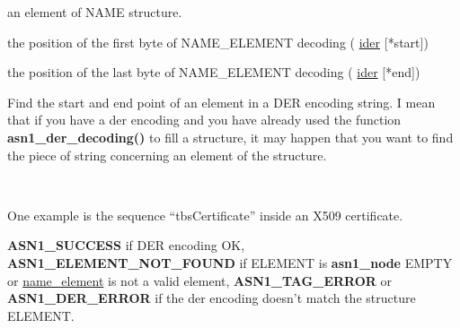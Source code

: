\documentclass[]{article}
\let\realtextbf=\textbf
\renewcommand{\textbf}[1]{\textcolor{boldcolor}{\realtextbf{#1}}}
\renewcommand{\emph}[1]{\underline{#1}}
\begin{document}
\begin{description}
\itemsep1pt\parskip0pt
\item[const char * name\_element]
an element of NAME structure.
\end{description}

\begin{description}
\itemsep1pt\parskip0pt
\item[int * start]
the position of the first byte of NAME\_ELEMENT decoding ( \emph{ider}
{[}*start{]})
\end{description}

\begin{description}
\itemsep1pt\parskip0pt
\item[int * end]
the position of the last byte of NAME\_ELEMENT decoding ( \emph{ider}
{[}*end{]})
\end{description}


Find the start and end point of an element in a DER encoding string. I
mean that if you have a der encoding and you have already used the
function \textbf{asn1\_der\_decoding()} to fill a structure, it may
happen that you want to find the piece of string concerning an element
of the structure.

~

One example is the sequence ``tbsCertificate'' inside an X509
certificate.


\textbf{ASN1\_SUCCESS} if DER encoding OK,
\textbf{ASN1\_ELEMENT\_NOT\_FOUND} if ELEMENT is \textbf{asn1\_node}
EMPTY or \emph{name\_element} is not a valid element,
\textbf{ASN1\_TAG\_ERROR} or \textbf{ASN1\_DER\_ERROR} if the der
encoding doesn't match the structure ELEMENT.

\end{document}
